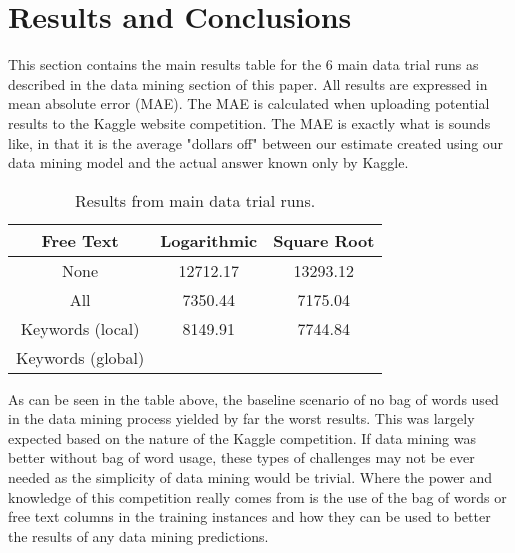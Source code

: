 \section{Results and Conclusions}

This section contains the main results table for the 6 main data trial runs as described in the data mining section
of this paper. All results are expressed in mean absolute error (MAE). The MAE is calculated when uploading potential
results to the Kaggle website competition. The MAE is exactly what is sounds like, in that it is the average
"dollars off" between our estimate created using our data mining model and the actual answer known only by Kaggle.\\

\begin{table}[h!]
\begin{center}
\begin{tabular}{c c c}
\hline
Free Text & Logarithmic & Square Root\\
\hline
\hline
None & 12712.17 & 13293.12\\
All & 7350.44 & 7175.04\\
Keywords (local) & 8149.91 & 7744.84\\
Keywords (global) & & \\
\hline
\end{tabular}
\end{center}
\caption{Results from main data trial runs.\label{tab:results}}
\end{table}

As can be seen in the table above, the baseline scenario of no bag of words used in the data mining process yielded
by far the worst results. This was largely expected based on the nature of the Kaggle competition. If data mining
was better without bag of word usage, these types of challenges may not be ever needed as the simplicity of data
mining would be trivial. Where the power and knowledge of this competition really comes from is the use of the
bag of words or free text columns in the training instances and how they can be used to better the results of any
data mining predictions.\\

